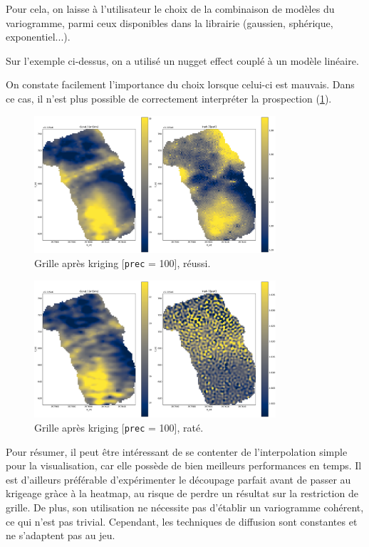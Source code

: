 \documentclass[12pt]{article}
\begin{document}
    Pour cela, on laisse à l'utilisateur le choix de la combinaison de modèles du variogramme, parmi ceux disponibles dans la librairie (gaussien, sphérique, exponentiel...).

    Sur l'exemple ci-dessus, on a utilisé un nugget effect couplé à un modèle linéaire.

    On constate facilement l'importance du choix lorsque celui-ci est mauvais. Dans ce cas, il n'est plus possible de correctement interpréter la prospection (\ref{fig:2_grid_kriging_im}).

    \begin{figure}[ht!]
        \centering
        \includegraphics[width=0.8\textwidth]{Images/Grid_Kriging_r4c04p100_3.png}  
        \caption{Grille après kriging [\texttt{prec} = 100], réussi.}
        \label{fig:2_grid_kriging_im}
    \end{figure}

    \begin{figure}[ht!]
        \centering
        \includegraphics[width=0.8\textwidth]{Images/Grid_Kriging_r4c04p100.png}  
        \caption{Grille après kriging [\texttt{prec} = 100], raté.}
    \end{figure}

    Pour résumer, il peut être intéressant de se contenter de l'interpolation simple pour la visualisation, car elle possède de bien meilleurs performances en temps. Il est d'ailleurs préférable d'expérimenter le découpage parfait avant de passer au krigeage gràce à la heatmap, au risque de perdre un résultat sur la restriction de grille. De plus, son utilisation ne nécessite pas d'établir un variogramme cohérent, ce qui n'est pas trivial. Cependant, les techniques de diffusion sont constantes et ne s'adaptent pas au jeu.
\end{document}
